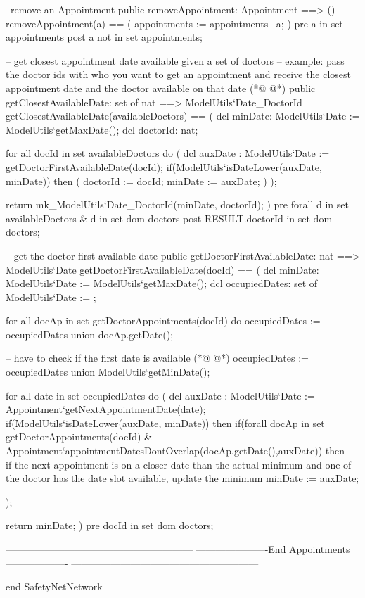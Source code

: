 \begin{vdmpp}[breaklines=true]
  --remove an Appointment
  public removeAppointment: Appointment ==> ()
  removeAppointment(a) == (
   appointments := appointments \ {a}; 
  )
  pre a in set appointments
  post a not in set appointments;
  
  
  
  -- get closest appointment date available given a set of doctors
  -- example: pass the doctor ids with who you want to get an appointment and receive the closest appointment date and the doctor available on that date
(*@
\label{getClosestAvailableDate:372}
@*)
  public getClosestAvailableDate: set of nat ==> ModelUtils`Date_DoctorId   
   getClosestAvailableDate(availableDoctors) == (
   dcl minDate: ModelUtils`Date := ModelUtils`getMaxDate(); 
   dcl doctorId: nat;
   
   for all docId in set availableDoctors do
   (
    dcl auxDate : ModelUtils`Date := getDoctorFirstAvailableDate(docId);
    if(ModelUtils`isDateLower(auxDate, minDate)) then
       (
        doctorId := docId;
        minDate := auxDate;
       )
   );
   
   return mk_ModelUtils`Date_DoctorId(minDate, doctorId);
  )
  pre forall d in set availableDoctors & d in set dom doctors
  post RESULT.doctorId in set dom doctors;
  
  -- get the doctor first available date
  public getDoctorFirstAvailableDate: nat ==> ModelUtils`Date   
   getDoctorFirstAvailableDate(docId) == (
   dcl minDate: ModelUtils`Date := ModelUtils`getMaxDate(); 
   dcl occupiedDates: set of ModelUtils`Date := {};
   
  
   for all docAp in set getDoctorAppointments(docId) do
    occupiedDates := occupiedDates union {docAp.getDate()};
   
   
   -- have to check if the first date is available
(*@
\label{getDoctorFirstAvailableDate:404}
@*)
   occupiedDates := occupiedDates union {ModelUtils`getMinDate()};
   
   for all date in set occupiedDates do
   (
    dcl auxDate : ModelUtils`Date := Appointment`getNextAppointmentDate(date);
    if(ModelUtils`isDateLower(auxDate, minDate)) then  
       if(forall docAp in set getDoctorAppointments(docId) &  Appointment`appointmentDatesDontOverlap(docAp.getDate(),auxDate)) then -- if the next appointment is on a closer date than the actual minimum and one of the doctor has the date slot available, update the minimum
        minDate := auxDate;
       
   );
   
   return minDate;
  )
  pre docId in set dom doctors;
 
  
  
   ---------------------------------------------------------
  ----------------------End Appointments-------------------
  ---------------------------------------------------------
  

end SafetyNetNetwork
\end{vdmpp}
